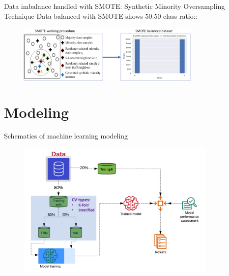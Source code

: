 \begin{frame}{Data imbalance handled with SMOTE: Synthetic Minority Oversampling Technique}
Data balanced with SMOTE shows 50:50 class ratio::
\begin{figure}
		\includegraphics[width=9.0cm]{figures/fig_smote_and_data.png}
	\end{figure}
\end{frame}





\section{Modeling} %

\begin{frame}{Schematics of machine learning modeling}
\begin{figure}
		\includegraphics[width=9.8cm]{figures/fig_model_schematics.png}
	\end{figure}
\end{frame}

